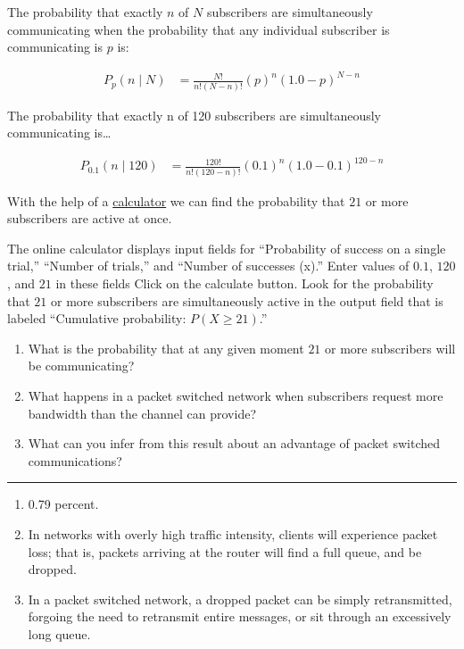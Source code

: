 \documentclass[twoside]{article}
\newenvironment{answer}
  {\vspace*{0.2cm} \rule{12cm}{0.04cm} \vspace*{0.2cm}}
  {\vspace*{0.2cm}}
\begin{document}
\begin{enumerate}
    The probability that exactly $n$ of $N$ subscribers are simultaneously communicating
    when the probability that any individual subscriber is communicating is $p$ is:

    \begin{align*}
      P_{p} (n \mid N ) & = \frac{N!}{n! (N - n)!} (p)^n (1.0 - p)^{N - n}
      \end{align*}

    The probability that exactly n of 120 subscribers are simultaneously communicating
    is\ldots

    \begin{align*}
      P_{0.1} (n \mid 120 ) & = \frac{120!}{n! (120 - n)!} (0.1)^n (1.0 - 0.1)^{120 - n}
      \end{align*}

    With the help of a \href{http://stattrek.com/online-calculator/binomial.aspx}{calculator}
    we can find the probability that $21$ or more
    subscribers are active at once.
  
    The online calculator displays input fields for ``Probability of success on a single trial,''
    ``Number of trials,'' and ``Number of successes (x).''
    Enter values of $0.1$, $120$, and $21$ in these fields
    Click on the calculate button.
    Look for the probability that $21$ or more subscribers are simultaneously active
    in the output field that is labeled ``Cumulative probability: $P(X \ge 21)$.''

    \begin{enumerate}
      \item What is the probability that at any given moment
        $21$ or more subscribers will be communicating?
      \item What happens in a packet switched network when subscribers
        request more bandwidth than the channel can provide?
      \item What can you infer from this result about an advantage
        of packet switched communications?
      \end{enumerate}

  \begin{answer}

  \begin{enumerate}
    \item 0.79 percent.
    \item In networks with overly high traffic intensity, clients will experience packet loss; that is, packets arriving at the router will find a 
	full queue, and be dropped.
    \item In a packet switched network, a dropped packet can be simply retransmitted, 
	forgoing the need to retransmit entire messages, or sit through an excessively long queue.
    \end{enumerate}


\end{answer}
\end{enumerate}
\end{document}
